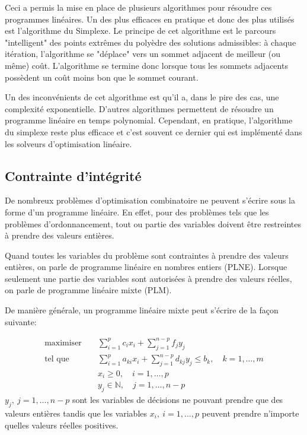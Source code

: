 Ceci a permis la mise en place de plusieurs algorithmes pour résoudre
ces programmes linéaires. Un des plus efficaces en pratique et donc
des plus utilisés est l'algorithme du Simplexe. Le principe de cet
algorithme est le parcours "intelligent" des points extrêmes du
polyèdre des solutions admissibles: à chaque itération, l'algorithme
se "déplace" vers un sommet adjacent de meilleur (ou même)
coût. L'algorithme se termine donc lorsque tous les sommets adjacents
possèdent un coût moins bon que le sommet courant.

Un des inconvénients de cet algorithme est qu'il a, dans le pire des
cas, une complexité exponentielle. D'autres algorithmes permettent de
résoudre un programme linéaire en temps polynomial. Cependant, en
pratique, l'algorithme du simplexe reste plus efficace et c'est
souvent ce dernier qui est implémenté dans les solveurs d'optimisation
linéaire. 

\subsection{Contrainte d'intégrité}

De nombreux problèmes d'optimisation combinatoire ne peuvent s'écrire
sous la forme d'un programme linéaire. En effet, pour des problèmes
tels que les problèmes d'ordonnancement, tout ou partie des
variables doivent être restreintes à prendre des valeurs entières.  

Quand toutes les variables du problème sont contraintes à prendre des
valeurs entières, on parle de programme linéaire en nombres
entiers (PLNE). Lorsque seulement une partie des variables sont
autorisées à prendre des valeurs réelles, on parle de programme
linéaire mixte (PLM). 

De manière générale, un programme linéaire mixte 
peut s'écrire de la façon suivante: 

\[ \begin{array}{lcl}
\text{maximiser } & & \displaystyle \sum_{i=1}^p c_ix_i +
\sum_{j=1}^{n-p} f_jy_j\\ \text{tel que }& & \displaystyle
\sum_{i=1}^p a_{ki}x_i + \sum_{j=1}^{n-p} d_{kj}y_j \le b_k, \quad
k=1,\dots,m\\ & & \displaystyle x_i \ge0,\quad i=1,\dots,p\\ & &
\displaystyle y_j \in \mathbb{N},\quad j=1,\dots,n-p 
\end{array}
\] $y_j,\ j=1,\dots,n-p$ sont les variables de décisions ne
pouvant prendre que des valeurs entières tandis que les variables
$x_i,\ i=1,\dots,p$ peuvent prendre n'importe quelles valeurs
réelles positives.

